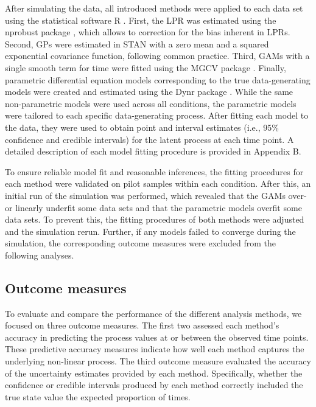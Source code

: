 \documentclass[man, floatsintext]{apa7}
\begin{document}
After simulating the data, all introduced methods were applied to each data set
using the statistical software R \parencite{R-base}. First, the LPR was
estimated using the nprobust package \parencite{R-nprobust}, which allows to
correction for the bias inherent in LPRs. Second, GPs were estimated in STAN
\parencite{R-cmdstanr} with a zero mean and a squared exponential covariance
function, following common practice. Third, GAMs with a single smooth term for
time were fitted using the MGCV package \parencite{R-mgcv_a}. Finally,
parametric differential equation models corresponding to the true
data-generating models were created and estimated using the Dynr package
\parencite{R-dynr}. While the same non-parametric models were used across all
conditions, the parametric models were tailored to each specific
data-generating process. After fitting each model to
the data, they were used to obtain point and interval estimates (i.e.,
95\% confidence and credible intervals) for the latent process at each time
point. A detailed description of each model fitting procedure
is provided in Appendix B.

To ensure reliable model fit and reasonable inferences, the fitting procedures
for each method were validated on pilot samples within each condition. After
this, an initial run of the simulation was performed, which revealed
that the GAMs over- or linearly underfit some data sets and that the parametric
models overfit some data sets. To prevent this, the fitting procedures of
both methods were adjusted and the simulation rerun. Further, if any
models failed to converge during the simulation, the corresponding outcome
measures were excluded from the following analyses.

\subsection{Outcome measures}

To evaluate and compare the performance of the different analysis methods, we
focused on three outcome measures. The first two assessed each method's
accuracy in predicting the process values at or between the observed time
points. These predictive accuracy measures indicate how well each method
captures the underlying non-linear process. The third outcome measure evaluated
the accuracy of the uncertainty estimates provided by each method.
Specifically, whether the confidence or credible intervals produced
by each method correctly included the true state value the expected proportion
of times.
\end{document}
